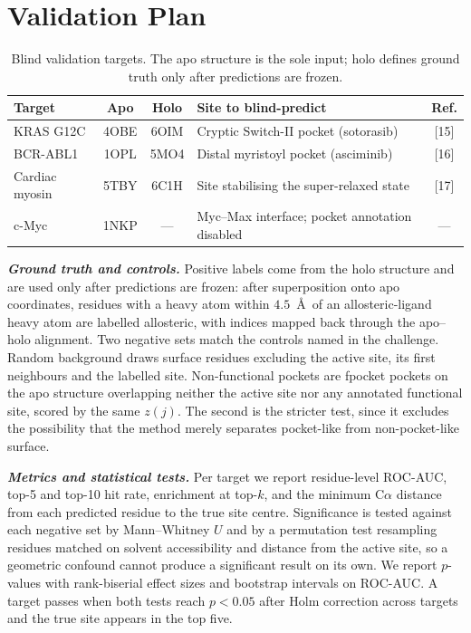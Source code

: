 \documentclass[10pt,a4paper]{article}
\newcommand{\lead}[1]{\textbf{\textit{#1}}}
\begin{document}
\section{Validation Plan}

\begin{table}[t]
\caption{Blind validation targets. The apo structure is the sole input; holo defines ground truth
only after predictions are frozen.}
\small
\begin{tabularx}{\textwidth}{@{}lcclc@{}}
\toprule
\textbf{Target} & \textbf{Apo} & \textbf{Holo} & \textbf{Site to blind-predict} & \textbf{Ref.}\\
\midrule
KRAS G12C       & 4OBE & 6OIM & Cryptic Switch-II pocket (sotorasib)            & [15]\\
BCR-ABL1        & 1OPL & 5MO4 & Distal myristoyl pocket (asciminib)             & [16]\\
Cardiac myosin  & 5TBY & 6C1H & Site stabilising the super-relaxed state        & [17]\\
c-Myc           & 1NKP & ---  & Myc--Max interface; pocket annotation disabled  & ---\\
\bottomrule
\end{tabularx}
\end{table}

\lead{Ground truth and controls.} Positive labels come from the holo structure and are used only after predictions are frozen: after
superposition onto apo coordinates, residues with a heavy atom within $4.5$~\AA\ of an
allosteric-ligand heavy atom are labelled allosteric, with indices mapped back through the apo--holo
alignment. Two negative sets match the controls named in the challenge. Random background draws
surface residues excluding the active site, its first neighbours and the labelled site.
Non-functional pockets are fpocket pockets on the apo structure overlapping neither the active site
nor any annotated functional site, scored by the same $z(j)$. The second is the stricter test, since
it excludes the possibility that the method merely separates pocket-like from non-pocket-like
surface.

\lead{Metrics and statistical tests.} Per target we report residue-level ROC-AUC, top-5 and top-10 hit rate, enrichment at top-$k$, and the
minimum C$\alpha$ distance from each predicted residue to the true site centre. Significance is
tested against each negative set by Mann--Whitney $U$ and by a permutation test resampling residues
matched on solvent accessibility and distance from the active site, so a geometric confound cannot
produce a significant result on its own. We report $p$-values with rank-biserial effect sizes and
bootstrap intervals on ROC-AUC. A target passes when both tests reach $p<0.05$ after Holm correction
across targets and the true site appears in the top five.
\end{document}
